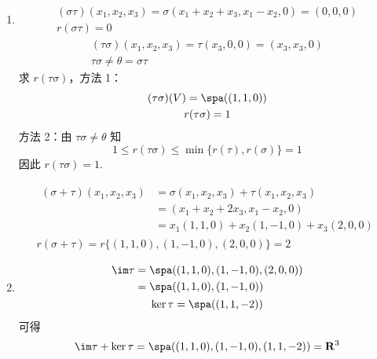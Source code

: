 \begin{enumerate}
\begin{enumerate}
              \item \begin{gather*}
                        (\sigma \tau)(x_1, x_2, x_3) = \sigma(x_1 + x_2 + x_3, x_1 - x_2, 0) = (0, 0, 0) \\
                        r(\sigma \tau) = 0
                    \end{gather*}
                    \begin{gather*}
                        (\tau \sigma)(x_1, x_2, x_3) = \tau(x_3, 0, 0) = (x_3, x_3, 0) \\
                        \tau \sigma \neq \theta = \sigma \tau
                    \end{gather*}
                    求 $ r(\tau \sigma) $，方法 1：
                    \begin{gather*}
                        (\tau \sigma)(V) = \spa((1, 1, 0)) \\
                        r(\tau \sigma) = 1
                    \end{gather*}
                    方法 2：由 $ \tau \sigma \neq \theta $ 知
                    \[ 1 \leqslant r(\tau \sigma) \leqslant \min\{r(\tau), r(\sigma)\} = 1 \]
                    因此 $ r(\tau \sigma) = 1 $.

                    \begin{gather*}
                        \begin{aligned}
                            (\sigma + \tau)(x_1, x_2, x_3) & = \sigma(x_1, x_2, x_3) + \tau(x_1, x_2, x_3) \\
                                                           & = (x_1 + x_2 + 2 x_3, x_1 - x_2, 0)           \\
                                                           & = x_1(1, 1, 0) + x_2(1, -1, 0) + x_3(2, 0, 0)
                        \end{aligned} \\
                        r(\sigma + \tau) = r\{(1, 1, 0), (1, -1, 0), (2, 0, 0)\} = 2
                    \end{gather*}

              \item \begin{gather*}
                        \begin{aligned}
                            \im \tau & = \spa((1, 1, 0), (1, -1, 0), (2, 0, 0)) \\
                                     & = \spa((1, 1, 0), (1, -1, 0))
                        \end{aligned} \\
                        \ker \tau = \spa((1, 1, -2))
                    \end{gather*}
                    可得
                    \[ \im \tau + \ker \tau = \spa((1, 1, 0), (1, -1, 0), (1, 1, -2)) = \mathbf{R}^3 \]
          \end{enumerate}


\end{enumerate}
